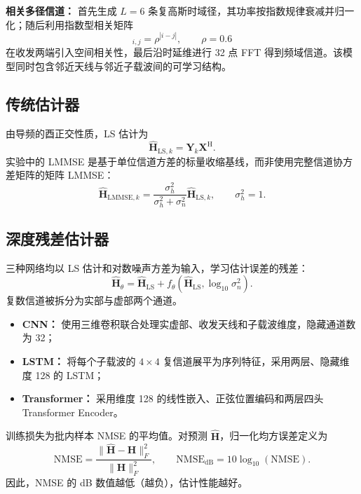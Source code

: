 \documentclass[UTF8,a4paper,12pt]{ctexart}
\begin{document}
\textbf{相关多径信道：} 首先生成 $L=6$ 条复高斯时域径，其功率按指数规律衰减并归一化；随后利用指数型相关矩阵
\begin{equation}
  [\bm R]_{i,j}=\rho^{|i-j|},\qquad \rho=0.6
\end{equation}
在收发两端引入空间相关性，最后沿时延维进行 32 点 FFT 得到频域信道。该模型同时包含邻近天线与邻近子载波间的可学习结构。

\subsection{传统估计器}

由导频的酉正交性质，LS 估计为
\begin{equation}
  \widehat{\bm H}_{\mathrm{LS},k}=\bm Y_k\bm X^{\mathrm H}.
\end{equation}
实验中的 LMMSE 是基于单位信道方差的标量收缩基线，而非使用完整信道协方差矩阵的矩阵 LMMSE：
\begin{equation}
  \widehat{\bm H}_{\mathrm{LMMSE},k}
  =\frac{\sigma_h^2}{\sigma_h^2+\sigma_n^2}
  \widehat{\bm H}_{\mathrm{LS},k},\qquad \sigma_h^2=1.
  \label{eq:lmmse}
\end{equation}

\subsection{深度残差估计器}

三种网络均以 LS 估计和对数噪声方差为输入，学习估计误差的残差：
\begin{equation}
  \widehat{\bm H}_{\theta}
  =\widehat{\bm H}_{\mathrm{LS}}+
  f_{\theta}\!\left(\widehat{\bm H}_{\mathrm{LS}},\log_{10}\sigma_n^2\right).
\end{equation}
复数信道被拆分为实部与虚部两个通道。

\begin{itemize}
  \item \textbf{CNN：} 使用三维卷积联合处理实虚部、收发天线和子载波维度，隐藏通道数为 32；
  \item \textbf{LSTM：} 将每个子载波的 $4\times4$ 复信道展平为序列特征，采用两层、隐藏维度 128 的 LSTM；
  \item \textbf{Transformer：} 采用维度 128 的线性嵌入、正弦位置编码和两层四头 Transformer Encoder。
\end{itemize}

训练损失为批内样本 NMSE 的平均值。对预测 $\widehat{\bm H}$，归一化均方误差定义为
\begin{equation}
  \mathrm{NMSE}=\frac{\lVert\widehat{\bm H}-\bm H\rVert_F^2}
  {\lVert\bm H\rVert_F^2},\qquad
  \mathrm{NMSE}_{\mathrm{dB}}=10\log_{10}(\mathrm{NMSE}).
  \label{eq:nmse}
\end{equation}
因此，NMSE 的 dB 数值越低（越负），估计性能越好。
\end{document}
